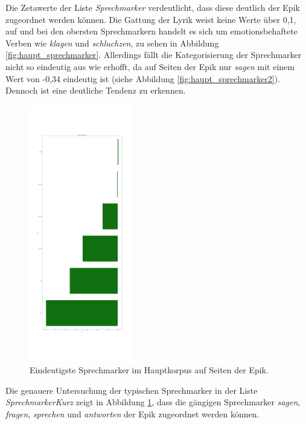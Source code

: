 \documentclass[a4paper,10p]{article}
\begin{document}
Die Zetawerte der Liste \textit{Sprechmarker} verdeutlicht, dass diese deutlich der Epik zugeordnet werden können. Die Gattung der Lyrik weist keine Werte über 0,1, auf und bei den obersten Sprechmarkern handelt es sich um emotionsbehaftete Verben wie \textit{klagen} und \textit{schluchzen}, zu sehen in Abbildung \ref{fig:haupt_sprechmarker}. Allerdings fällt die Kategorisierung der Sprechmarker nicht so eindeutig aus wie erhofft, da auf Seiten der Epik nur \textit{sagen} mit einem Wert von -0,34 eindeutig ist (siehe Abbildung \ref{fig:haupt_sprechmarker2}). Dennoch ist eine deutliche Tendenz zu erkennen. \par 

\begin{figure}
	\includegraphics[width=0.4\textwidth]{haupt_sprechmarkerKurz_pro_wort.png}
	\caption{Eindeutigste Sprechmarker im Hauptkorpus auf Seiten der Epik.}
	\label{fig:haupt_sprechmarkerKurz}
\end{figure}


Die genauere Untersuchung der typischen Sprechmarker in der Liste \textit{SprechmarkerKurz} zeigt in Abbildung \ref{fig:haupt_sprechmarkerKurz}, dass die gängigen Sprechmarker \textit{sagen}, \textit{fragen}, \textit{sprechen} und \textit{antworten} der Epik zugeordnet werden können. \par 
\end{document}
